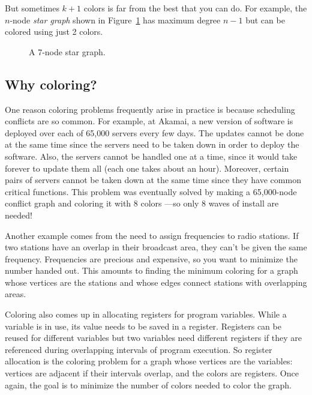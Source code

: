 But sometimes $k+1$ colors is far from the best that you can do.
For example, the $n$-node \emph{star graph} shown in
Figure~\ref{fig:5T} has maximum degree $n - 1$ but can be colored
using just 2 colors.

\begin{figure}


\caption{A 7-node star graph.}

\label{fig:5T}

\end{figure}


\subsection{Why coloring?}

One reason coloring problems frequently arise in practice is because
scheduling conflicts are so common.  For example, at Akamai, a new
version of software is deployed over each of 65,000 servers every few
days.  The updates cannot be done at the same time since the servers
need to be taken down in order to deploy the software.  Also, the
servers cannot be handled one at a time, since it would take forever
to update them all (each one takes about an hour).  Moreover, certain
pairs of servers cannot be taken down at the same time since they have
common critical functions.  This problem was eventually solved by
making a 65,000-node conflict graph and coloring it with 8 colors ---so
only 8 waves of install are needed!

Another example comes from the need to assign frequencies to radio
stations.  If two stations have an overlap in their broadcast area, they
can't be given the same frequency.  Frequencies are precious and
expensive, so you want to minimize the number handed out.  This amounts to
finding the minimum coloring for a graph whose vertices are the stations
and whose edges connect stations with overlapping areas.

Coloring also comes up in allocating registers for program variables.
While a variable is in use, its value needs to be saved in a register.
Registers can be reused for different variables but two variables need
different registers if they are referenced during overlapping
intervals of program execution.  So register allocation is the
coloring problem for a graph whose vertices are the variables:
vertices are adjacent if their intervals overlap, and the colors are
registers.  Once again, the goal is to minimize the number of colors
needed to color the graph.

